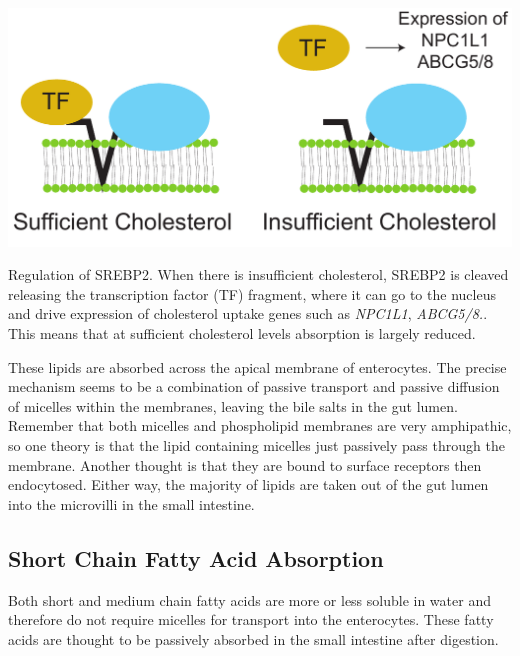 \documentclass{tufte-handout}
\begin{document}
\begin{marginfigure}
\includegraphics{figures/srebp2-intestine.pdf}
\caption{Regulation of SREBP2.  When there is insufficient cholesterol, SREBP2 is cleaved releasing the transcription factor (TF) fragment, where it can go to the nucleus and drive expression of cholesterol uptake genes such as \textit{NPC1L1}, \textit{ABCG5/8.}.  This means that at sufficient cholesterol levels absorption is largely reduced.}
\label{fig:srebp2}
\end{marginfigure}

  These lipids are absorbed across the apical membrane of enterocytes.  The precise mechanism seems to be a combination of passive transport and passive diffusion of micelles within the membranes, leaving the bile salts in the gut lumen.  Remember that both micelles and phospholipid membranes are very amphipathic, so one theory is that the lipid containing micelles just passively pass through the membrane.  Another thought is that they are bound to surface receptors then endocytosed.  Either way, the majority of lipids are taken out of the gut lumen into the microvilli in the small intestine.


\subsection{Short Chain Fatty Acid Absorption}

Both short and medium chain fatty acids are more or less soluble in water and therefore do not require micelles for transport into the enterocytes.  These fatty acids are thought to be passively absorbed in the small intestine after digestion.
\end{document}
